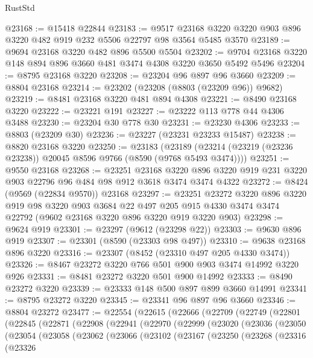 \begin{lexlean}{RustStd}
\begin{coremodule}
@23168 := @15418 @22844
@23183 := @9517 @23168 @3220 @3220 @903 @896 @3220 @482 @919 @232 @5506 @22797 @98 @3564 @5485 @3570
@23189 := @9694 @23168 @3220 @482 @896 @5500 @5504
@23202 := @9704 @23168 @3220 @148 @894 @896 @3660 @481 @3474 @4308 @3220 @3650 @5492 @5496
@23204 := @8795 @23168 @3220
@23208 := @23204 @96 @897 @96 @3660
@23209 := @8804 @23168
@23214 := @23202 (@23208 (@8803 (@23209 @96)) @9682)
@23219 := @8481 @23168 @3220 @481 @894 @4308
@23221 := @8490 @23168 @3220
@23222 := @23221 @191
@23227 := @23222 @113 @778 @44 @4306 @3488
@23230 := @23204 @30 @778 @30
@23231 := @23230 @4306
@23233 := @8803 (@23209 @30)
@23236 := @23227 (@23231 @23233 @15487)
@23238 := @8820 @23168 @3220
@23250 := @23183
    (@23189 (@23214 (@23219 (@23236 @23238)) @20045 @8596 @9766 (@8590 (@9768 @5493 @3474))))
@23251 := @9550 @23168
@23268 := @23251
    @23168
    @3220
    @896
    @3220
    @919
    @231
    @3220
    @903
    @22796
    @96
    @484
    @98
    @912
    @3618
    @3474
    @3474
    @4322
@23272 := @8424 (@9569 (@22834 @9570)) @23168
@23297 := @23251
    @23272
    @3220
    @896
    @3220
    @919
    @98
    @3220
    @903
    @3684
    @22
    @497
    @205
    @915
    @4330
    @3474
    @3474
    @22792
    (@9602 @23168 @3220 @896 @3220 @919 @3220 @903)
@23298 := @9624 @919
@23301 := @23297 (@9612 (@23298 @22))
@23303 := @9630 @896 @919
@23307 := @23301 (@8590 (@23303 @98 @497))
@23310 := @9638 @23168 @896 @3220
@23316 := @23307 (@8452 (@23310 @497 @205 @4330 @3474))
@23326 := @8467 @23272 @3220 @766 @501 @900 @903 @3474 @14992 @3220 @926
@23331 := @8481 @23272 @3220 @501 @900 @14992
@23333 := @8490 @23272 @3220
@23339 := @23333 @148 @500 @897 @899 @3660 @14991
@23341 := @8795 @23272 @3220
@23345 := @23341 @96 @897 @96 @3660
@23346 := @8804 @23272
@23477 := @22554
    (@22615
      (@22666
        (@22709
          (@22749
            (@22801
              (@22845
                (@22871
                  (@22908
                    (@22941
                      (@22970
                        (@22999
                          (@23020
                            (@23036
                              (@23050
                                (@23054
                                  (@23058
                                    (@23062
                                      (@23066
                                        (@23102
                                          (@23167
                                            (@23250
                                              (@23268
                                                (@23316
                                                  (@23326

\end{coremodule}
\end{lexlean}

